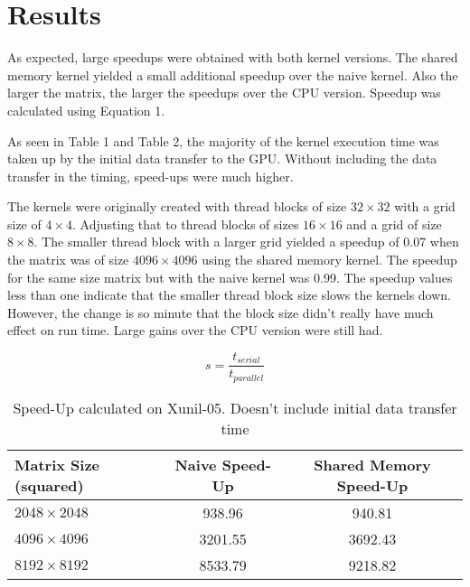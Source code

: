 \documentclass[12pt]{article}
\begin{document}
\pagebreak
\vspace{-0.6cm}
\section{Results}
\vspace{-0.4cm}

As expected, large speedups were obtained with both kernel versions.
The shared memory kernel yielded a small additional speedup over the
naive kernel. Also the larger the matrix, the larger the speedups
over the CPU version. Speedup was calculated using Equation 1.

As seen in Table 1 and Table 2, the majority of the kernel execution time
was taken up by the initial data transfer to the GPU. Without including
the data transfer in the timing, speed-ups were much higher.

The kernels were originally created with thread blocks of size $32 \times 32$
with a grid size of $4 \times 4$. Adjusting that to 
thread blocks of sizes $16 \times 16$ and a grid of size $8 \times 8$. 
The smaller thread block with a larger grid yielded a speedup of 
0.07 when the matrix was of size $4096 \times 4096$ using the
shared memory kernel. The speedup for the same size matrix but with
the naive kernel was 0.99. The speedup values less than one indicate
that the smaller thread block size slows the kernels down. However,
the change is so minute that the block size didn't really have much effect
on run time. Large gains over the CPU version were still had.

\begin{equation}
    s = \frac{t_{serial}}{t_{parallel}}\label{eq1}
\end{equation}


\begin{table}[H]
\centering
\begin{tabular}{@{}|l|c|c|}
\hline
Matrix Size (squared) & Naive Speed-Up  & Shared Memory Speed-Up \\ \hline
$2048 \times 2048$      & 938.96          & 940.81  \\ \hline 
$4096 \times 4096$      & 3201.55         & 3692.43 \\ \hline 
$8192 \times 8192$      & 8533.79         & 9218.82 \\ \hline 
\end{tabular}
\caption{Speed-Up calculated on Xunil-05. Doesn't include initial data transfer
time}
\end{table}
\end{document}
